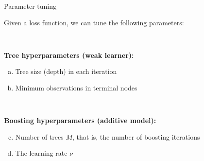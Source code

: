 \documentclass[
  10pt,
  ignorenonframetext,
]{beamer}
\begin{document}
\begin{frame}{Parameter tuning}
\protect\hypertarget{parameter-tuning}{}
\(~\)

Given a loss function, we can tune the following parameters:

\(~\)

\textbf{Tree hyperparameters (weak learner):}

\begin{enumerate}
[a)]
\item
  Tree size (depth) in each iteration
\item
  Minimum observations in terminal nodes
\end{enumerate}

\(~\)

\textbf{Boosting hyperparameters (additive model):}

\begin{enumerate}
[a)]
\setcounter{enumi}{2}
\item
  Number of trees \(M\), that is, the number of boosting iterations
\item
  The learning rate \(\nu\)
\end{enumerate}
\end{frame}
\end{document}

